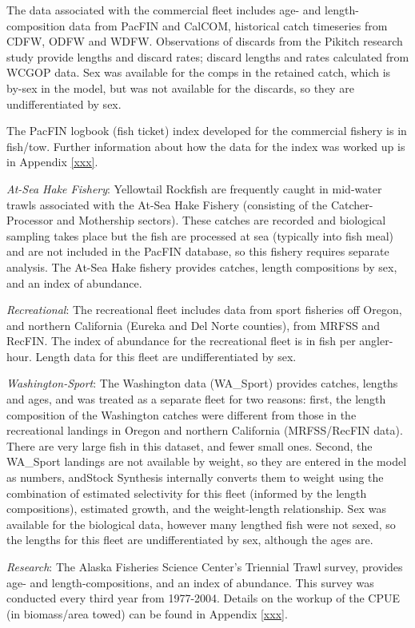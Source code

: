\documentclass[12pt,]{article}
\begin{document}
The data associated with the commercial fleet includes age- and
length-composition data from PacFIN and CalCOM, historical catch
timeseries from CDFW, ODFW and WDFW. Observations of discards from the
Pikitch research study provide lengths and discard rates; discard
lengths and rates calculated from WCGOP data. Sex was available for the
comps in the retained catch, which is by-sex in the model, but was not
available for the discards, so they are undifferentiated by sex.

The PacFIN logbook (fish ticket) index developed for the commercial
fishery is in fish/tow. Further information about how the data for the
index was worked up is in Appendix \ref{xxx}.

\emph{At-Sea Hake Fishery}: Yellowtail Rockfish are frequently caught in
mid-water trawls associated with the At-Sea Hake Fishery (consisting of
the Catcher-Processor and Mothership sectors). These catches are
recorded and biological sampling takes place but the fish are processed
at sea (typically into fish meal) and are not included in the PacFIN
database, so this fishery requires separate analysis. The At-Sea Hake
fishery provides catches, length compositions by sex, and an index of
abundance.

\emph{Recreational}: The recreational fleet includes data from sport
fisheries off Oregon, and northern California (Eureka and Del Norte
counties), from MRFSS and RecFIN. The index of abundance for the
recreational fleet is in fish per angler-hour. Length data for this
fleet are undifferentiated by sex.

\emph{Washington-Sport}: The Washington data (WA\_Sport) provides
catches, lengths and ages, and was treated as a separate fleet for two
reasons: first, the length composition of the Washington catches were
different from those in the recreational landings in Oregon and northern
California (MRFSS/RecFIN data). There are very large fish in this
dataset, and fewer small ones. Second, the WA\_Sport landings are not
available by weight, so they are entered in the model as numbers,
andStock Synthesis internally converts them to weight using the
combination of estimated selectivity for this fleet (informed by the
length compositions), estimated growth, and the weight-length
relationship. Sex was available for the biological data, however many
lengthed fish were not sexed, so the lengths for this fleet are
undifferentiated by sex, although the ages are.

\emph{Research}: The Alaska Fisheries Science Center's Triennial Trawl
survey, provides age- and length-compositions, and an index of
abundance. This survey was conducted every third year from 1977-2004.
Details on the workup of the CPUE (in biomass/area towed) can be found
in Appendix \ref{xxx}.
\end{document}
